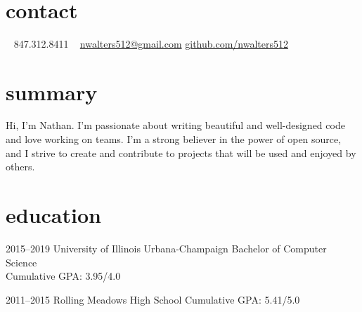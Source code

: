 \documentclass[nofooter]{resume}
\begin{document}


\begin{aside} %
~\vspace{-0.50cm} %
\section{contact}
\vspace{-0.20cm} %
~
847.312.8411
~
\href{mailto:nwalters512@gmail.com}{nwalters512@gmail.com}
\href{http://github.com/nwalters512}{github.com/nwalters512}
\end{aside}


\section{summary}

Hi, I'm Nathan. I'm passionate about writing beautiful and well-designed code and love working on teams. I'm a strong believer in the power of open source, and I strive to create and contribute to projects that will be used and enjoyed by others.


\section{education}

\begin{entrylist}


\entry
{2015--2019}
{University of Illinois Urbana-Champaign}
{}
{Bachelor of Computer Science \\
Cumulative GPA: 3.95/4.0}


\entry
{2011--2015}
{Rolling Meadows High School}
{}
{Cumulative GPA: 5.41/5.0}


\end{entrylist}
\end{document}
